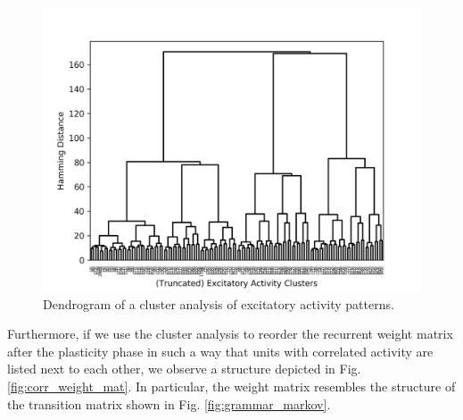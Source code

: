 \documentclass[10pt,a4paper]{article}
\begin{document}
\begin{figure}
\includegraphics[width=\textwidth]{../../plots/act_dendrogram.png}
\caption{\label{fig:act_dendrogram} Dendrogram of a cluster analysis of excitatory activity patterns.}
\end{figure}

Furthermore, if we use the cluster analysis to reorder the recurrent weight matrix after the plasticity phase in such a way that units with correlated activity are listed next to each other, we observe a structure depicted in Fig. \ref{fig:corr_weight_mat}. In particular, the weight matrix resembles the structure of the transition matrix shown in Fig. \ref{fig:grammar_markov}.
\end{document}
